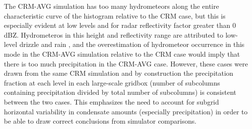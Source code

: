 \documentclass[letter]{article}
\begin{document}
The CRM-AVG simulation has too many hydrometeors along the entire characteristic curve of the histogram relative to the CRM case, but this is especially evident at low levels and for radar reflectivity factor greater than $0$ dBZ. Hydrometeros in this height and reflectivity range are attributed to low-level drizzle and rain \citep{marchand_et_al_2009}, and the overestimation of hydrometeor occurrence in this mode in the CRM-AVG simulation relative to the CRM case would imply that there is too much precipitation in the CRM-AVG case. However, these cases were drawn from the same CRM simulation and by construction the precipitation fraction at each level in each large-scale gridbox (number of subcolumns containing precipitation divided by total number of subcolumns) is consistent between the two cases. This emphasizes the need to account for subgrid horizontal variability in condensate amounts (especially precipitation) in order to be able to draw correct conclusions from simulator comparisons.
\end{document}
